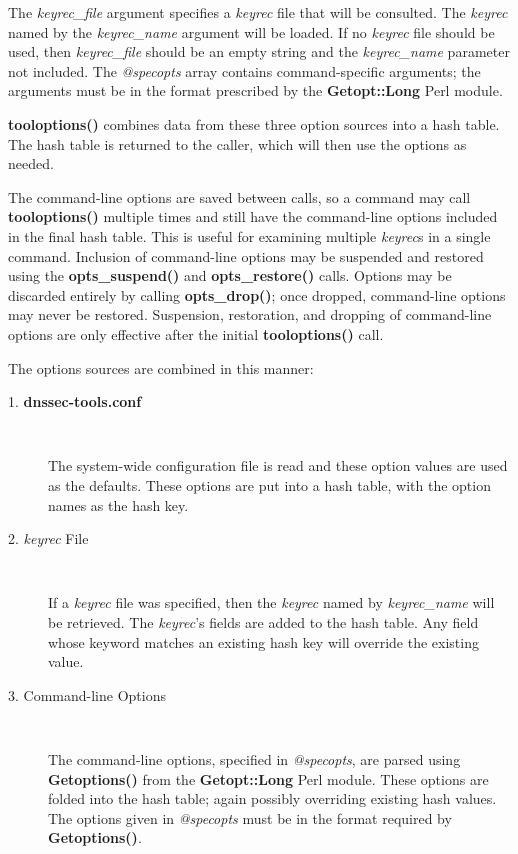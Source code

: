 The {\it keyrec\_file} argument specifies a {\it keyrec} file that will be
consulted.  The {\it keyrec} named by the {\it keyrec\_name} argument will
be loaded.  If no {\it keyrec} file should be used, then {\it keyrec\_file}
should be an empty string and the {\it keyrec\_name} parameter not included.
The {\it @specopts} array contains command-specific arguments; the arguments
must be in the format prescribed by the {\bf Getopt::Long} Perl module.

{\bf tooloptions()} combines data from these three option sources into a hash
table.  The hash table is returned to the caller, which will then use the
options as needed.

The command-line options are saved between calls, so a command may call {\bf
tooloptions()} multiple times and still have the command-line options included
in the final hash table.  This is useful for examining multiple {\it keyrec}s
in a single command.  Inclusion of command-line options may be suspended and
restored using the {\bf opts\_suspend()} and {\bf opts\_restore()} calls.
Options may be discarded entirely by calling {\bf opts\_drop()}; once dropped,
command-line options may never be restored.  Suspension, restoration, and
dropping of command-line options are only effective after the initial {\bf
tooloptions()} call.

The options sources are combined in this manner:

\begin{description}

\item [1.  {\bf dnssec-tools.conf}]\verb" "

The system-wide configuration file is read and these option values are used
as the defaults.  These options are put into a hash table, with the option
names as the hash key.

\item [2. {\it keyrec} File]\verb" "

If a {\it keyrec} file was specified, then the {\it keyrec} named by {\it
keyrec\_name} will be retrieved.  The {\it keyrec}'s fields are added to the
hash table.  Any field whose keyword matches an existing hash key will
override the existing value.

\item [3. Command-line Options]\verb" "

The command-line options, specified in {\it @specopts}, are parsed using {\bf
Getoptions()} from the {\bf Getopt::Long} Perl module.  These options are
folded into the hash table; again possibly overriding existing hash values.
The options given in {\it @specopts} must be in the format required by {\bf
Getoptions()}.

\end{description}

